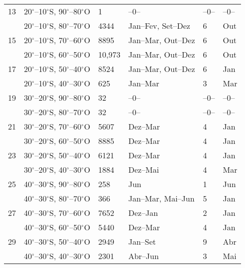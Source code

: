 \begin{table}[!ht]
\begin{tabularx}{\textwidth}{p{0.6cm} p{3.5cm} W W W W}
13&20$^{\circ}$--10$^{\circ}$S, 90$^{\circ}$--80$^{\circ}$O& 1  &   --0--  & --0-- & --0-- \\[1.5pt]&20$^{\circ}$--10$^{\circ}$S, 80$^{\circ}$--70$^{\circ}$O& 4344 & Jan--Fev,  Set--Dez  &6& Out\\[1.5pt]
15&20$^{\circ}$--10$^{\circ}$S, 70$^{\circ}$--60$^{\circ}$O& 8895 & Jan--Mar, Out--Dez &6& Out\\[1.5pt]&20$^{\circ}$--10$^{\circ}$S, 60$^{\circ}$--50$^{\circ}$O& 10,973 & Jan--Mar,  Out--Dez &6& Out\\[1.5pt]
17&20$^{\circ}$--10$^{\circ}$S, 50$^{\circ}$--40$^{\circ}$O& 8524 & Jan--Mar, Out--Dez &6&  Jan\\[1.5pt]&20$^{\circ}$--10$^{\circ}$S, 40$^{\circ}$--30$^{\circ}$O& 625  & Jan--Mar &3&  Mar\\[1.5pt]

19&30$^{\circ}$--20$^{\circ}$S, 90$^{\circ}$--80$^{\circ}$O& 32 & --0-- & --0-- &  --0-- \\[1.5pt]&30$^{\circ}$--20$^{\circ}$S, 80$^{\circ}$--70$^{\circ}$O& 32 & --0-- &--0--&  --0--\\[1.5pt]
21&30$^{\circ}$--20$^{\circ}$S, 70$^{\circ}$--60$^{\circ}$O& 5607 & Dez--Mar &4& Jan\\[1.5pt]&30$^{\circ}$--20$^{\circ}$S, 60$^{\circ}$--50$^{\circ}$O& 8885  & Dez--Mar &4& Jan\\[1.5pt]
23&30$^{\circ}$--20$^{\circ}$S, 50$^{\circ}$--40$^{\circ}$O& 6121 & Dez--Mar &4& Jan\\[1.5pt]&30$^{\circ}$--20$^{\circ}$S, 40$^{\circ}$--30$^{\circ}$O& 1884 & Dez--Mai&4&  Mar\\[1.5pt]

25&40$^{\circ}$--30$^{\circ}$S, 90$^{\circ}$--80$^{\circ}$O& 258 & Jun &1&  Jun \\[1.5pt]&40$^{\circ}$--30$^{\circ}$S, 80$^{\circ}$--70$^{\circ}$O& 366 & Jan--Mar, Mai--Jun &5& Jan \\[1.5pt]
27&40$^{\circ}$--30$^{\circ}$S, 70$^{\circ}$--60$^{\circ}$O& 7652 & Dez--Jan &2&  Jan\\[1.5pt]&40$^{\circ}$--30$^{\circ}$S, 60$^{\circ}$--50$^{\circ}$O& 5440 & Dez--Mar  &4&  Jan\\[1.5pt]
29&40$^{\circ}$--30$^{\circ}$S, 50$^{\circ}$--40$^{\circ}$O& 2949 & Jan--Set &9&  Abr\\[1.5pt]&40$^{\circ}$--30$^{\circ}$S, 40$^{\circ}$--30$^{\circ}$O& 2301 & Abr--Jun  &3& Mai\\[1.5pt]


\hline 
\end{tabularx}
\end{table}

